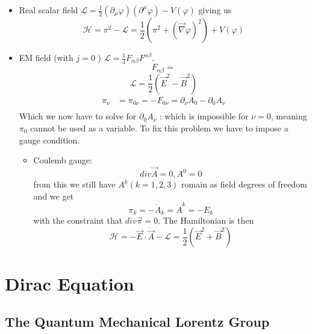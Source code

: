 \documentclass{report}
\begin{document}
\begin{itemize}
  \item Real scalar field $\mathcal{L}  = \frac{1}{2} \left( \partial_\mu \varphi  \right) \left( \partial^{\mu} \varphi  \right) - V\left( \varphi \right) $ giving us \[
  \mathcal{H} = \pi^2 - \mathcal{L} = \frac{1}{2} \left( \pi^2 + \left( \vec{\nabla } \varphi \right) ^2 \right) + V\left( \varphi \right) 
  \] 
\item EM field (with $j =0$ ) $\mathcal{L} = \frac{1}{4} F_{\alpha \beta} F^{\alpha \beta} $. \[
F_{\alpha \beta} = 
\] \[
\mathcal{L} = \frac{1}{2} \left( \vec{E}^2 - \vec{B}^2 \right) 
\] 
\begin{align*}
  \pi_\nu &= \pi_{0 \nu} = -F_{0\nu} = \partial_\nu A_0 - \partial_0 A_\nu \\
\end{align*} Which we now have to solve for $\partial_0 A_\nu$ : which is impossible for $\nu = 0$, meaning $\pi_0$ cannot be used as a variable. To fix this problem we have to impose a gauge condition.
\begin{itemize}
  \item Coulemb gauge: \[
  div \vec{A} = 0 , A^{0} = 0
  \] from this we still have $A^{k} \left( k=1,2,3 \right) $ romain as field degrees of freedom and we get \[
  \pi_k = - \dot{A}_k = \dot{A}^{k} = -E_k
  \] with the constraint that $div \vec{\pi} = 0$. The Hamiltonian is then \[
  \mathcal{H} = - \vec{E} \cdot \dot{\vec{A}} - \mathcal{L} = \frac{1}{2} \left( \vec{E}^2 + \vec{B}^2 \right)  
  \]  
\end{itemize}
\end{itemize}
\chapter{Dirac Equation}
\section{The Quantum Mechanical Lorentz Group}
\end{document}
